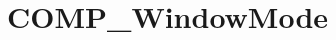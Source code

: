 \hypertarget{group___c_o_m_p___window_mode}{\section{C\-O\-M\-P\-\_\-\-Window\-Mode}
\label{group___c_o_m_p___window_mode}
}

